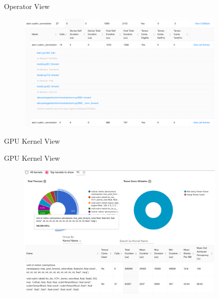 \documentclass[compress,aspectratio=169]{beamer}
\begin{document}
\begin{frame}{Operator View}
    \vspace{-1em}
\begin{center}
    \begin{figure}
        \includegraphics[width=0.9\textwidth]{../../data/scap_gtx1080_profiler-torch_batch-size-64_14650758_operator-view-details}
    \end{figure}
    \end{center}
\end{frame}

\begin{frame}
\begin{center}
GPU Kernel View
\end{center}
\end{frame}

\begin{frame}{GPU Kernel View}
    \vspace{-1em}
\begin{center}
    \begin{figure}
        \includegraphics[width=0.9\textwidth]{../../data/scap_gtx1080_profiler-torch_batch-size-64_14650758_gpu-kernel-view}
    \end{figure}
    \end{center}
\end{frame}
\end{document}
